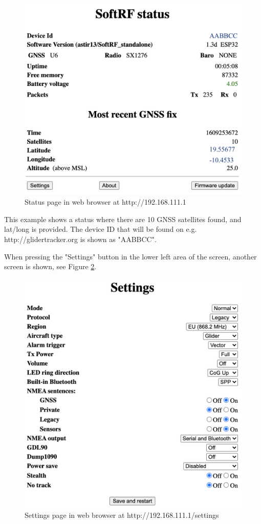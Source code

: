 \documentclass[10pt,a4paper]{article}
\begin{document}
\begin{figure}[h]
\centering
\includegraphics[scale=.6]{status.png}
\caption{Status page in web browser at http://192.168.111.1}\label{status}
\end{figure}\FloatBarrier

This example shows a status where there are 10 GNSS satellites found, and lat/long is provided. The device ID that will be found on e.g. http://glidertracker.org is shown as "AABBCC".

When pressing the "Settings" button in the lower left area of the screen, another screen is shown, see Figure \ref{settings}.

\begin{figure}[h]
\centering
\includegraphics[scale=.6]{settings.png}
\caption{Settings page in web browser at http://192.168.111.1/settings}\label{settings}
\end{figure}\FloatBarrier
\end{document}
